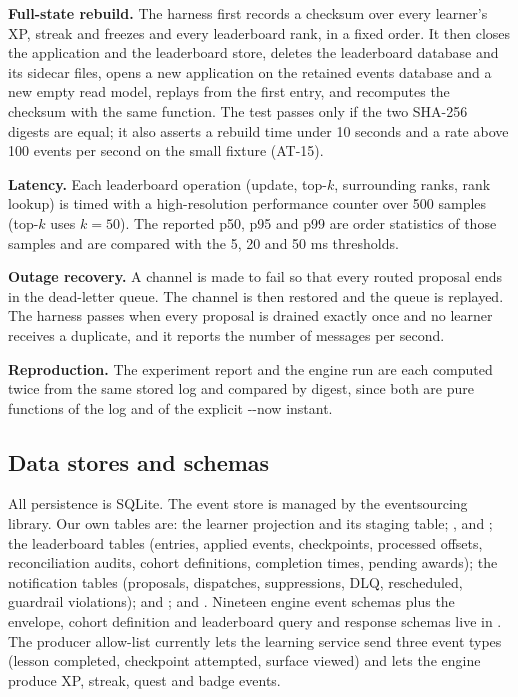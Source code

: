 \documentclass[11pt,a4paper]{article}
\newcommand{\cmd}[1]{{\sffamily\small #1}}
\newcommand{\fl}{-{}-}
\renewcommand{\_}{\textunderscore\allowbreak{}}
\begin{document}
\textbf{Full-state rebuild.} The harness first records a checksum over every learner's XP, streak and freezes and every leaderboard rank, in a fixed order. It then closes the application and the leaderboard store, deletes the leaderboard database and its sidecar files, opens a new application on the retained events database and a new empty read model, replays from the first entry, and recomputes the checksum with the same function. The test passes only if the two SHA-256 digests are equal; it also asserts a rebuild time under 10 seconds and a rate above 100 events per second on the small fixture (AT-15).

\textbf{Latency.} Each leaderboard operation (update, top-$k$, surrounding ranks, rank lookup) is timed with a high-resolution performance counter over 500 samples (top-$k$ uses $k=50$). The reported p50, p95 and p99 are order statistics of those samples and are compared with the 5, 20 and 50 ms thresholds.

\textbf{Outage recovery.} A channel is made to fail so that every routed proposal ends in the dead-letter queue. The channel is then restored and the queue is replayed. The harness passes when every proposal is drained exactly once and no learner receives a duplicate, and it reports the number of messages per second.

\textbf{Reproduction.} The experiment report and the engine run are each computed twice from the same stored log and compared by digest, since both are pure functions of the log and of the explicit \cmd{\fl now} instant.

\subsection{Data stores and schemas}

All persistence is SQLite. The event store is managed by the eventsourcing library. Our own tables are: the learner projection and its staging table; ,  and ; the leaderboard tables (entries, applied events, checkpoints, processed offsets, reconciliation audits, cohort definitions, completion times, pending awards); the notification tables (proposals, dispatches, suppressions, DLQ, rescheduled, guardrail violations);  and ; and . Nineteen engine event schemas plus the envelope, cohort definition and leaderboard query and response schemas live in . The producer allow-list currently lets the learning service send three event types (lesson completed, checkpoint attempted, surface viewed) and lets the engine produce XP, streak, quest and badge events.
\end{document}
